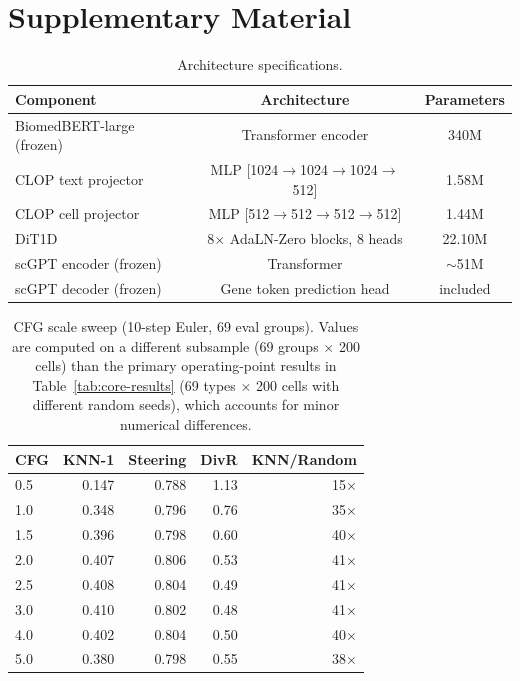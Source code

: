 \documentclass[preprint,12pt]{elsarticle}
\begin{document}
        \FloatBarrier

\FloatBarrier

\appendix
\section{Supplementary Material}\label{app:suppl-tables}\label{app:hyperparams}

\begin{table}[htbp]
\caption{Architecture specifications.\label{tab:architecture}}
\begin{tabularx}{\textwidth}{lCC}
\toprule
\textbf{Component} & \textbf{Architecture} & \textbf{Parameters} \\
\midrule
BiomedBERT-large (frozen) & Transformer encoder  & 340M \\
CLOP text projector       & MLP [1024$\to$1024$\to$1024$\to$512] & 1.58M \\
CLOP cell projector       & MLP [512$\to$512$\to$512$\to$512]    & 1.44M \\
DiT1D                     & 8$\times$ AdaLN-Zero blocks, 8 heads & 22.10M \\
scGPT encoder (frozen)    & Transformer                          & $\sim$51M \\
scGPT decoder (frozen)    & Gene token prediction head           & included \\
\bottomrule
\end{tabularx}
\end{table}

\begin{table}[htbp]
\caption{CFG scale sweep (10-step Euler, 69 eval groups). Values are computed on a different subsample (69 groups $\times$ 200 cells) than the primary operating-point results in Table~\ref{tab:core-results} (69 types $\times$ 200 cells with different random seeds), which accounts for minor numerical differences.\label{tab:cfg-sweep}}
\centering
\begin{tabular}{lrrrr}
\toprule
\textbf{CFG} & \textbf{KNN-1} & \textbf{Steering} & \textbf{DivR} & \textbf{KNN/Random} \\
\midrule
0.5 & 0.147 & 0.788 & 1.13 & 15$\times$ \\
1.0 & 0.348 & 0.796 & 0.76 & 35$\times$ \\
1.5 & 0.396 & 0.798 & 0.60 & 40$\times$ \\
2.0 & 0.407 & 0.806 & 0.53 & 41$\times$ \\
2.5 & 0.408 & 0.804 & 0.49 & 41$\times$ \\
3.0 & 0.410 & 0.802 & 0.48 & 41$\times$ \\
4.0 & 0.402 & 0.804 & 0.50 & 40$\times$ \\
5.0 & 0.380 & 0.798 & 0.55 & 38$\times$ \\
\bottomrule
\end{tabular}
\end{table}
\end{document}
